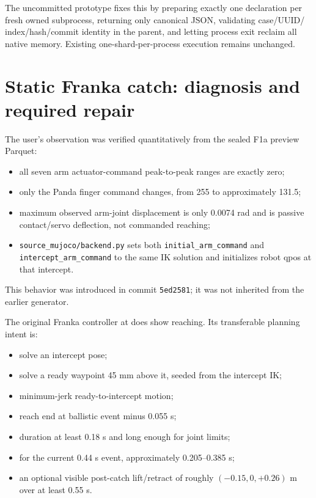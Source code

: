 \documentclass[11pt]{article}
\begin{document}
The uncommitted prototype fixes this by preparing exactly one declaration per
fresh owned subprocess, returning only canonical JSON, validating case/UUID/
index/hash/commit identity in the parent, and letting process exit reclaim all
native memory.  Existing one-shard-per-process execution remains unchanged.

\section{Static Franka catch: diagnosis and required repair}

The user's observation was verified quantitatively from the sealed F1a
preview Parquet:

\begin{itemize}
  \item all seven arm actuator-command peak-to-peak ranges are exactly zero;
  \item only the Panda finger command changes, from 255 to approximately 131.5;
  \item maximum observed arm-joint displacement is only 0.0074 rad and is
        passive contact/servo deflection, not commanded reaching;
  \item \texttt{source\_mujoco/backend.py} sets both
        \texttt{initial\_arm\_command} and
        \texttt{intercept\_arm\_command} to the same IK solution and initializes
        robot qpos at that intercept.
\end{itemize}

This behavior was introduced in commit \texttt{5ed2581}; it was not inherited
from the earlier generator.

The original Franka controller at
does show reaching.  Its transferable planning intent is:

\begin{itemize}
  \item solve an intercept pose;
  \item solve a ready waypoint 45 mm above it, seeded from the intercept IK;
  \item minimum-jerk ready-to-intercept motion;
  \item reach end at ballistic event minus 0.055 s;
  \item duration at least 0.18 s and long enough for joint limits;
  \item for the current 0.44 s event, approximately 0.205--0.385 s;
  \item an optional visible post-catch lift/retract of roughly
        \((-0.15,0,+0.26)\) m over at least 0.55 s.
\end{itemize}
\end{document}
